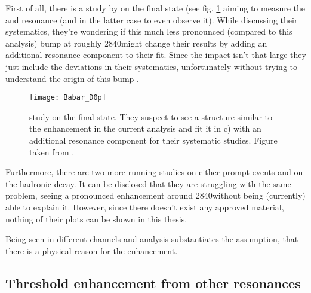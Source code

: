 First of all, there is a study by \babar on the \Dz\proton final state (see fig. \ref{fig:Babar_D0p} aiming to measure the \LcResI and \LcResII resonance (and in the latter case to even observe it).
While discussing their systematics, they're wondering if this much less pronounced (compared to this analysis) bump at roughly 2840\mev might change their results by adding an additional resonance component to their fit. 
Since the impact isn't that large they just include the deviations in their systematics, unfortunately without trying to understand the origin of this bump \cite{Babar_D0p}.
\begin{figure}[hptb]
	\centering
	\texttt{[image: Babar\_D0p]}
	\caption{\babar study on the \Dz\proton final state. They suspect to see a structure similar to the enhancement in the current analysis and fit it in c) with an additional resonance component for their systematic studies. Figure taken from \cite{Babar_D0p}.}
	\label{fig:Babar_D0p}
\end{figure}

Furthermore, there are two more running \lhcb studies on either prompt \Dz\proton events and on the hadronic \decay{\Lb}{\Dz\proton\pim} decay.
It can be disclosed that they are struggling with the same problem, seeing a pronounced enhancement around 2840\mev without being (currently) able to explain it.
However, since there doesn't exist any approved material, nothing of their plots can be shown in this thesis.

Being seen in different channels and analysis substantiates the assumption, that there is a physical reason for the enhancement.

\subsection{Threshold enhancement from other resonances}


